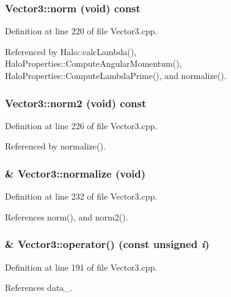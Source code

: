 \subsubsection[{norm}]{ Vector3::norm (void) const}\label{classVector3_a8eacbf2e984bf2dc389a9b74136af839}


Definition at line 220 of file Vector3.cpp.



Referenced by Halo::calcLambda(), HaloProperties::ComputeAngularMomentum(), HaloProperties::ComputeLambdaPrime(), and normalize().

\subsubsection[{norm2}]{ Vector3::norm2 (void) const}\label{classVector3_a37503304451b4709760b16bd03bc6cdf}


Definition at line 226 of file Vector3.cpp.



Referenced by normalize().

\subsubsection[{normalize}]{ \& Vector3::normalize (void)}\label{classVector3_a29306c8a59642a807872a3239b92af65}


Definition at line 232 of file Vector3.cpp.



References norm(), and norm2().

\subsubsection[{operator()}]{ \& Vector3::operator() (const unsigned {\em i})}\label{classVector3_ab82f293f33397e921c38259b1045cf18}


Definition at line 191 of file Vector3.cpp.



References data\_\-.

